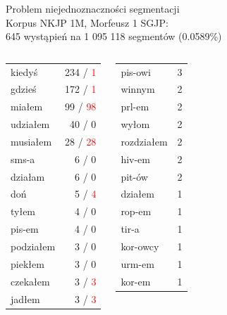 \documentclass[xcolor=dvipsnames,polish]{beamer}
\newcommand{\markerr}[1]{\textcolor{red}{#1}}
\begin{document}
\begin{frame}{Problem niejednoznaczności segmentacji}
  \\
  Korpus NKJP 1M, Morfeusz 1 SGJP:\\
  645 wystąpień na 1 095 118 segmentów (0.0589\%)
  \begin{columns}[c]
    \begin{center}
      \footnotesize
      \begin{tabular}{l|r}
      kiedyś & 234 / \markerr{1} \\
      gdzieś & 172 / \markerr{1} \\
      miałem & 99 / \markerr{98} \\
      udziałem & 40 / 0 \\
      musiałem & 28 / \markerr{28} \\
      sms-a & 6 / 0 \\
      działam & 6 / 0\\
      doń & 5 / \markerr{4} \\
      tyłem & 4 / 0 \\
      pis-em & 4 / 0 \\
      podziałem & 3 / 0 \\
      piekłem & 3 / 0 \\
      czekałem & 3 / \markerr{3} \\
      jadłem & 3 / \markerr{3} \\
      \end{tabular}
    \end{center}
    \begin{center}
      \footnotesize
      \begin{tabular}{l|r}
        pis-owi & 3 \\
        winnym & 2 \\
        prl-em & 2 \\
        wyłom & 2 \\
        rozdziałem & 2 \\
        hiv-em & 2 \\
        pit-ów & 2 \\
        działem & 1 \\
        rop-em & 1 \\
        tir-a & 1 \\
        kor-owcy & 1 \\
        urm-em & 1 \\
        kor-em & 1 \\

\end{tabular}
\end{center}
\end{columns}
\end{frame}
\end{document}

